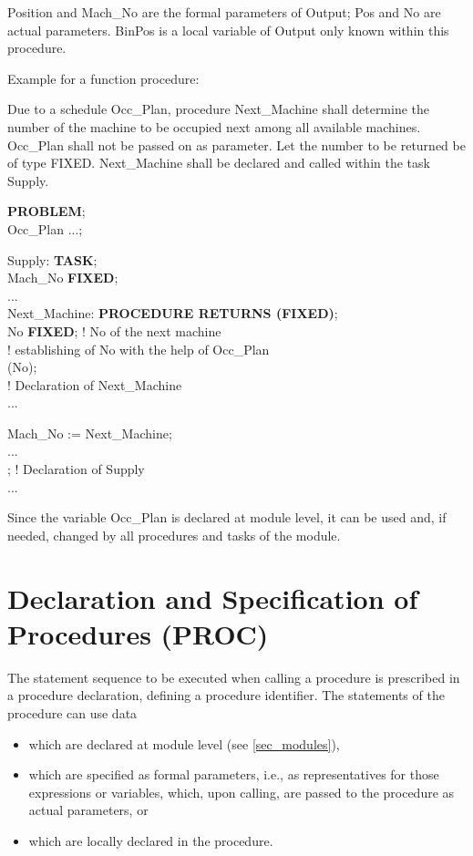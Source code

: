 Position and Mach\_No are the formal parameters of Output; Pos and No
are actual parameters. BinPos is a local variable of Output only known
within this procedure.

Example for a function procedure:

Due to a schedule Occ\_Plan, procedure Next\_Machine shall determine the
number of the machine to be occupied next among all available machines.
Occ\_Plan shall not be passed on as parameter. Let the number to be
returned be of type FIXED. Next\_Machine shall be declared and called
within the task Supply.

{\bf PROBLEM};\\
 Occ\_Plan ...;

\x Supply: {\bf TASK};\\
\x \x {} Mach\_No {\bf FIXED};\\
\x \x \x ... \\
\x \x \x Next\_Machine: {\bf PROCEDURE RETURNS (FIXED)};\\
\x \x \x \x {} No {\bf FIXED}; ! No of the next machine\\
\x \x \x \x \x \x ! establishing of No with the help of Occ\_Plan\\
\x \x \x \x {} (No);\\
\x \x \x {} ! Declaration of Next\_Machine\\
\x \x \x ...

\x \x \x Mach\_No := Next\_Machine;\\
\x \x \x ... \\
\x {}; ! Declaration of Supply\\
\x ...

Since the variable Occ\_Plan is declared at module level, it can be used
and, if needed, changed by all procedures and tasks of the module.

\section{Declaration and Specification of Procedures (PROC)}  %
\label{sec_proc_dcl}

The statement sequence to be executed when calling a procedure is
prescribed in a procedure declaration, defining a procedure identifier.
The statements of the procedure can use data
\begin{itemize}
\item which are declared at module level
(see \ref{sec_modules}),
\item which are specified as formal parameters, i.e., as representatives
for those expressions or variables, which, upon calling, are passed
to the procedure as actual parameters, or
\item which are locally declared in the procedure.
\end{itemize}

